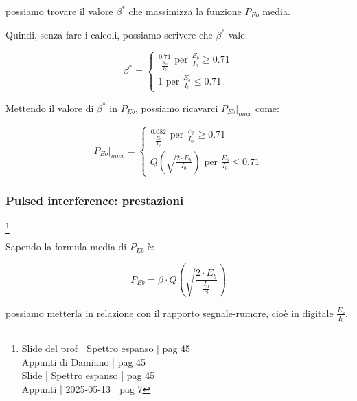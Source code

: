 possiamo trovare il valore $\beta^{*}$ che massimizza la funzione $P_{Eb}$ media. \newline 

Quindi, senza fare i calcoli, 
possiamo scrivere che $\beta^{*}$ vale: 

{
    \Large 
    \begin{equation}
        \beta^{*}
        = 
        \begin{cases}
            \frac{0.71}{\frac{E_b}{I_0}} \text{ per } \frac{E_b}{I_0} \ge 0.71 
            \\
            1 \text{ per } \frac{E_b}{I_0} \le 0.71
        \end{cases}
    \end{equation}
}

Mettendo il valore di $\beta^{*}$ in $P_{Eb}$, 
possiamo ricavarci $\left. P_{Eb} \right|_{max}$ come: 

{
    \Large 
    \begin{equation}
        \left. P_{Eb} \right|_{max}
        = 
        \begin{cases}
            \frac{0.082}{\frac{E_b}{I_0}} \text{ per } \frac{E_b}{I_0} \ge 0.71 
            \\
            Q 
        \left(
            \sqrt{\frac{2 \cdot E_b}{I_0}}
        \right) \text{ per } \frac{E_b}{I_0} \le 0.71
        \end{cases}
    \end{equation}
}

\newpage 

\subsubsection{Pulsed interference: prestazioni}
\footnote{Slide del prof | Spettro espanso | pag 45 \\
Appunti di Damiano | pag 45 \\
Slide | Spettro espanso | pag 45 \\
Appunti | 2025-05-13 | pag 7 
} 

Sapendo la formula media di $P_{Eb}$ è: 

{
    \Large 
    \begin{equation}
          P_{Eb}
        =
        \beta
        \cdot
           Q 
        \left(
            \sqrt{\frac{2 \cdot E_b}{\frac{I_0}{\beta}}}
        \right)
    \end{equation}
}

possiamo metterla in relazione con il rapporto segnale-rumore, 
cioè in digitale $\frac{E_b}{I_0}$. \newline 

